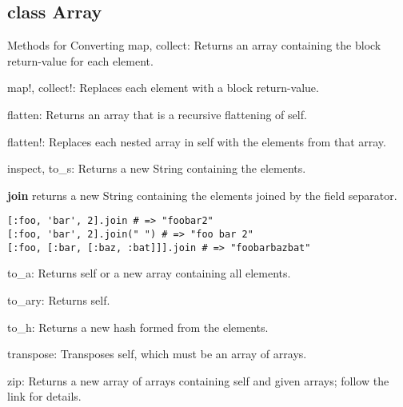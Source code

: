 \subsection{class Array}

Methods for Converting
map, collect: Returns an array containing the block return-value for each element.

map!, collect!: Replaces each element with a block return-value.

flatten: Returns an array that is a recursive flattening of self.

flatten!: Replaces each nested array in self with the elements from that array.

inspect, to\_s: Returns a new String containing the elements.

\textbf{join} returns a new String containing the elements joined by the field separator.
\begin{verbatim}
[:foo, 'bar', 2].join # => "foobar2"
[:foo, 'bar', 2].join(" ") # => "foo bar 2"
[:foo, [:bar, [:baz, :bat]]].join # => "foobarbazbat"
\end{verbatim}

to\_a: Returns self or a new array containing all elements.

to\_ary: Returns self.

to\_h: Returns a new hash formed from the elements.

transpose: Transposes self, which must be an array of arrays.

zip: Returns a new array of arrays containing self and given arrays; follow the link for details.